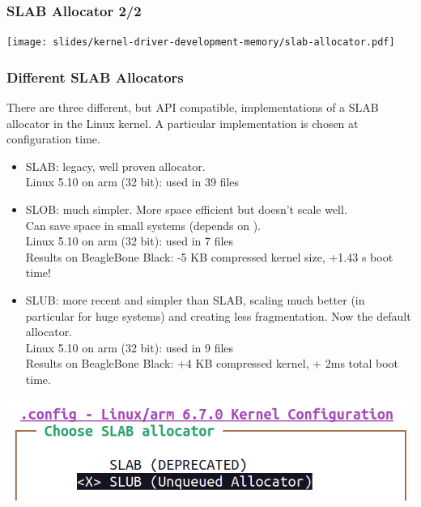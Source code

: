 \begin{frame}
  \frametitle{SLAB Allocator 2/2}
  \begin{center}
    \texttt{[image: slides/kernel-driver-development-memory/slab-allocator.pdf]}
  \end{center}
\end{frame}

\begin{frame}[fragile]
  \frametitle{Different SLAB Allocators}
  \small
  There are three different, but API compatible, implementations of
  a SLAB allocator in the Linux kernel. A particular implementation
  is chosen at configuration time.
  \begin{itemize}
  \item SLAB: legacy, well proven allocator.\\
        Linux 5.10 on arm (32 bit): used in 39  files
  \item SLOB: much simpler. More space efficient but doesn't scale well.\\
        Can save space in small systems (depends on ). \\
        Linux 5.10 on arm (32 bit): used in 7  files \\
        Results on BeagleBone Black: -5 KB compressed kernel size, +1.43 s boot time!
  \item SLUB: more recent and simpler than
        SLAB, scaling much better (in particular for huge systems) and
        creating less fragmentation. Now the default allocator.\\
        Linux 5.10 on arm (32 bit): used in 9  files \\
	Results on BeagleBone Black: +4 KB compressed kernel, + 2ms total boot time.
  \end{itemize}
  \begin{center}
    \includegraphics[height=0.2\textheight]{slides/kernel-driver-development-memory/slab-screenshot.png}
  \end{center}
\end{frame}

